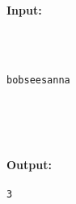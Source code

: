\paragraph{\textbf{    Input:   }}
\begin{verbatim}



bobseesanna





\end{verbatim}

\paragraph{   Output:  }
\begin{verbatim}
3\end{verbatim}